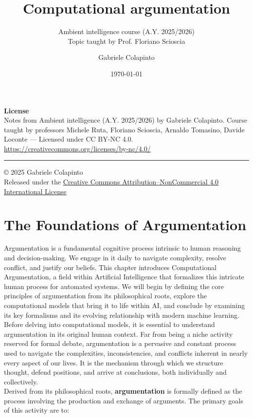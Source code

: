 \documentclass{scrbook}
\title{Computational argumentation}
\subtitle{Ambient intelligence course (A.Y. 2025/2026)\\Topic taught by Prof. Floriano Scioscia}
\author{Gabriele Colapinto}
\date{\today}
\begin{document}
\maketitle
\thispagestyle{empty}

{\Large\textbf{License}} \\
{Notes from Ambient intelligence (A.Y. 2025/2026) by Gabriele Colapinto. 
Course taught by professors Michele Ruta, Floriano Scioscia, Arnaldo Tomasino, Davide Loconte — 
Licensed under CC BY-NC 4.0.\\
\url{https://creativecommons.org/licenses/by-nc/4.0/}}

\vspace*{\fill}
\rule{\textwidth}{0.2pt}
\small{© 2025 Gabriele Colapinto \\
Released under the \href{https://creativecommons.org/licenses/by-nc/4.0/}{Creative Commons Attribution–NonCommercial 4.0 International License}}

\clearpage

\tableofcontents

\chapter{The Foundations of Argumentation}

Argumentation is a fundamental cognitive process intrinsic to human reasoning and decision-making. We engage in it daily to navigate complexity, resolve conflict, and justify our beliefs. This chapter introduces Computational Argumentation, a field within Artificial Intelligence that formalizes this intricate human process for automated systems. We will begin by defining the core principles of argumentation from its philosophical roots, explore the computational models that bring it to life within AI, and conclude by examining its key formalisms and its evolving relationship with modern machine learning. \\

Before delving into computational models, it is essential to understand argumentation in its original human context. Far from being a niche activity reserved for formal debate, argumentation is a pervasive and constant process used to navigate the complexities, inconsistencies, and conflicts inherent in nearly every aspect of our lives. It is the mechanism through which we structure thought, defend positions, and arrive at conclusions, both individually and collectively. \\

Derived from its philosophical roots, \textbf{argumentation} is formally defined as the process involving the production and exchange of arguments. The primary goals of this activity are to:
\end{document}
